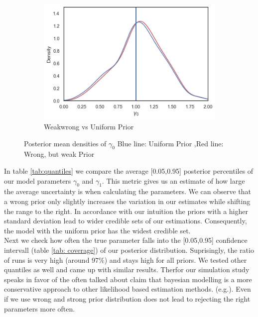 \begin{figure}[h!]
  \centering
  \begin{subfigure}[b]{0.4\linewidth}
    \includegraphics[width=\linewidth]{graphics/mean_plot_gamma0_unib_weakwrongr}
    \caption{Weakwrong vs Uniform Prior}
  \end{subfigure}
  \caption{Posterior mean densities of $\gamma_0$ Blue line: Uniform Prior ,Red line: Wrong, but weak Prior}
  \label{fig:weak_uni}
\end{figure}




In table  \ref{tab:quantiles} we compare the average [0.05,0.95] posterior percentiles of our model parameters $\gamma_0$ and $\gamma_1$. 
This metric gives us an estimate of how large the average uncertainty is when calculating the parameters. We can observe that a wrong prior only slightly increases the variation in our estimates while shifting the range to the right. 
In accordance with our intuition the priors with a higher standard deviation lead to wider credible sets of our estimations. Consequently, the model with the uniform prior has the widest credible set. \\

Next  we check how often the true parameter falls into the [0.05,0.95] confidence intervall (table \ref{tab: coverage}) of our posterior distribution. Suprisingly, the ratio of runs is very high (around 97\%) and stays high for all priors.
We tested other quantiles as well and came up with similar results. Therfor our simulation study speaks in favor of the often talked about claim that bayesian modelling is a more conservative approach to other likelihood based estimation methods.  (e.g.\cite{stegmueller2013}). Even if we use wrong and strong prior distribution does not lead to rejecting the right parameters more often.



